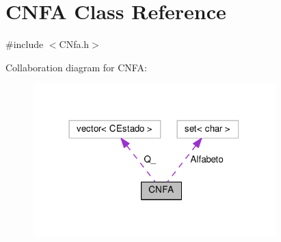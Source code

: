 \hypertarget{classCNFA}{}\section{C\+N\+FA Class Reference}
\label{classCNFA}


{\ttfamily \#include $<$C\+Nfa.\+h$>$}



Collaboration diagram for C\+N\+FA\+:
\nopagebreak
\begin{figure}[H]
\begin{center}
\leavevmode
\includegraphics[width=266pt]{classCNFA__coll__graph}
\end{center}
\end{figure}
